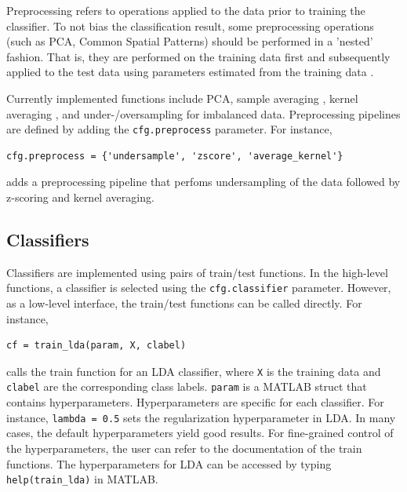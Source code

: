\documentclass[utf8]{frontiersSCNS} %
\newcommand{\ttt}[1]{\texttt{#1}}
\begin{document}
Preprocessing refers to operations applied to the data prior to training the classifier. To not bias the classification result, some preprocessing operations (such as PCA, Common Spatial Patterns) should be performed in a 'nested' fashion. That is, they are performed on the training data first and subsequently applied to the test data using parameters estimated from the training data \citep{Lemm2011,Varoquaux2017}. 

Currently implemented functions include PCA, sample averaging \citep{Cichy2017MultivariateSpace}, kernel averaging \citep{Treder2018}, and under-/oversampling for imbalanced data. Preprocessing pipelines are defined by adding the \ttt{cfg.preprocess} parameter. For instance,

\begin{verbatim}
cfg.preprocess = {'undersample', 'zscore', 'average_kernel'}
\end{verbatim}

adds a preprocessing pipeline that perfoms undersampling of the data followed by z-scoring and kernel averaging.

\subsection{Classifiers}\label{sec:classifiers}

Classifiers are implemented using pairs of train/test functions. In the high-level functions, a classifier is selected using the \ttt{cfg.classifier} parameter. However, as a low-level interface, the train/test functions can be called directly. For instance, 

\begin{verbatim}
cf = train_lda(param, X, clabel)
\end{verbatim}

calls the train function for an LDA classifier, where \ttt{X} is the training data and \ttt{clabel} are the corresponding class labels. \ttt{param} is a MATLAB struct that contains hyperparameters. Hyperparameters are specific for each classifier. For instance, \ttt{lambda = 0.5} sets the regularization hyperparameter in LDA. In many cases, the default hyperparameters yield good results. For fine-grained control of the hyperparameters, the user can refer to the documentation of the train functions. The hyperparameters for LDA can be accessed by typing \ttt{help(train\_lda)} in MATLAB. 
\end{document}
